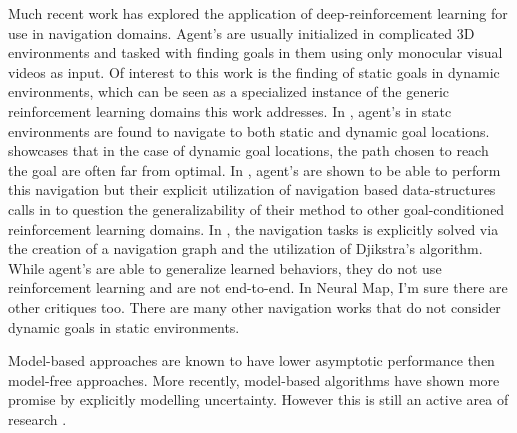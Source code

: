 Much recent work has explored the application of deep-reinforcement
learning for use in navigation domains. Agent's are usually initialized
in complicated 3D environments and tasked with finding goals in them
using only monocular visual videos as input. Of interest to this work is
the finding of static goals in dynamic environments, which can be seen
as a specialized instance of the generic reinforcement learning domains
this work addresses. In \citet{mirowski2016learning}, agent's in statc
environments are found to navigate to both static and dynamic goal
locations.  \citet{dhiman2018critical} showcases that in the case of
dynamic goal locations, the path chosen to reach the goal are often far
from optimal. In \citet{gupta2017cognitive},  agent's are shown to be
able to perform this navigation but their explicit utilization of
navigation based data-structures calls in to question the
generalizability of their method to other goal-conditioned reinforcement
learning domains. In \cite{savinov2018semi}, the navigation tasks is
explicitly solved via the creation of a navigation graph and the
utilization of Djikstra's algorithm. While agent's are able to
generalize learned behaviors, they do not use reinforcement learning and
are not end-to-end. In Neural Map, I'm sure there are other critiques
too. There are many other navigation works that do not consider dynamic
goals in static environments. 

Model-based approaches are known to have lower asymptotic performance
then model-free approaches. More recently, model-based algorithms have
shown more promise by explicitly modelling uncertainty. However this is
still an active area of research \cite{lakshminarayanan2017simple,
kurutach2018model,zhang2018solar}.

%



